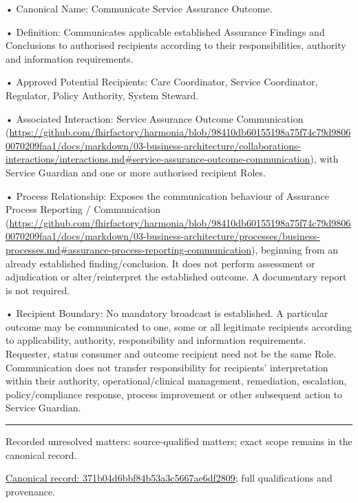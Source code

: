 •
Canonical Name: Communicate Service Assurance Outcome.



•
Definition: Communicates applicable established Assurance Findings and Conclusions to authorised recipients according to their responsibilities, authority and information requirements.



•
Approved Potential Recipients: Care Coordinator, Service Coordinator, Regulator, Policy Authority, System Steward.



•
Associated Interaction: Service Assurance Outcome Communication (\url{https://github.com/fhirfactory/harmonia/blob/98410db60155198a75f74c79d98060070209faa1/docs/markdown/03-business-architecture/collaborations-interactions/interactions.md#service-assurance-outcome-communication}), with Service Guardian and one or more authorised recipient Roles.



•
Process Relationship: Exposes the communication behaviour of Assurance Process Reporting / Communication (\url{https://github.com/fhirfactory/harmonia/blob/98410db60155198a75f74c79d98060070209faa1/docs/markdown/03-business-architecture/processes/business-processes.md#assurance-process-reporting-communication}), beginning from an already established finding/conclusion. It does not perform assessment or adjudication or alter/reinterpret the established outcome. A documentary report is not required.



•
Recipient Boundary: No mandatory broadcast is established. A particular outcome may be communicated to one, some or all legitimate recipients according to applicability, authority, responsibility and information requirements. Requester, status consumer and outcome recipient need not be the same Role. Communication does not transfer responsibility for recipients' interpretation within their authority, operational/clinical management, remediation, escalation, policy/compliance response, process improvement or other subsequent action to Service Guardian.



\medskip\hrule\medskip

{\small Recorded unresolved matters: source-qualified matters; exact scope remains in the canonical record.}\par
{\footnotesize \href{../../../../continuum/business/business-service/371b04d6bbf84b53a3c5667ae6df2809.md}{Canonical record: 371b04d6bbf84b53a3c5667ae6df2809}; full qualifications and provenance.}\par
